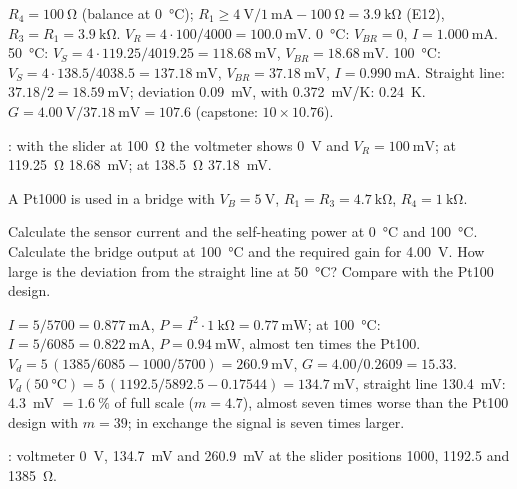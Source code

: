 \begin{solution}
\begin{talist}
\ta $R_4 = \SI{100}{\ohm}$ (balance at \SI{0}{\celsius}); $R_1 \geq \SI{4}{\volt}/\SI{1}{\milli\ampere} - \SI{100}{\ohm} = \SI{3.9}{\kilo\ohm}$ (E12), $R_3 = R_1 = \SI{3.9}{\kilo\ohm}$.
\ta $V_R = 4\cdot 100/4000 = \SI{100.0}{\milli\volt}$.
	\SI{0}{\celsius}: $V_{BR} = 0$, $I = \SI{1.000}{\milli\ampere}$.
	\SI{50}{\celsius}: $V_S = 4\cdot 119.25/4019.25 = \SI{118.68}{\milli\volt}$, $V_{BR} = \SI{18.68}{\milli\volt}$.
	\SI{100}{\celsius}: $V_S = 4\cdot 138.5/4038.5 = \SI{137.18}{\milli\volt}$, $V_{BR} = \SI{37.18}{\milli\volt}$, $I = \SI{0.990}{\milli\ampere}$.
\ta Straight line: $37.18/2 = \SI{18.59}{\milli\volt}$; deviation \SI{0.09}{\milli\volt}, with \SI{0.372}{\milli\volt/\kelvin}: \SI{0.24}{\kelvin}.
\ta $G = \SI{4.00}{\volt}/\SI{37.18}{\milli\volt} = 107.6$ (capstone: $10\times 10.76$).
\item[] : with the slider at \SI{100}{\ohm} the voltmeter shows \SI{0}{\volt} and $V_R = \SI{100}{\milli\volt}$;
	at \SI{119.25}{\ohm} \SI{18.68}{\milli\volt}; at \SI{138.5}{\ohm} \SI{37.18}{\milli\volt}.
\end{talist}
\end{solution}

A Pt1000 is used in a bridge with $V_B = \SI{5}{\volt}$, $R_1 = R_3 = \SI{4.7}{\kilo\ohm}$, $R_4 = \SI{1}{\kilo\ohm}$.
\begin{talist}
\ta Calculate the sensor current and the self-heating power at \SI{0}{\celsius} and \SI{100}{\celsius}.
\ta Calculate the bridge output at \SI{100}{\celsius} and the required gain for \SI{4.00}{\volt}.
\ta How large is the deviation from the straight line at \SI{50}{\celsius}? Compare with the Pt100 design.
\end{talist}

\begin{solution}
\begin{talist}
\ta $I = 5/5700 = \SI{0.877}{\milli\ampere}$, $P = I^2\cdot\SI{1}{\kilo\ohm} = \SI{0.77}{\milli\watt}$;
	at \SI{100}{\celsius}: $I = 5/6085 = \SI{0.822}{\milli\ampere}$, $P = \SI{0.94}{\milli\watt}$, almost ten times the Pt100.
\ta $V_d = 5\,(1385/6085 - 1000/5700) = \SI{260.9}{\milli\volt}$, $G = 4.00/0.2609 = 15.33$.
\ta $V_d(\SI{50}{\celsius}) = 5\,(1192.5/5892.5 - 0.17544) = \SI{134.7}{\milli\volt}$, straight line \SI{130.4}{\milli\volt}:
	\SI{4.3}{\milli\volt} $= \SI{1.6}{\percent}$ of full scale ($m = 4.7$), almost seven times worse than the Pt100 design with $m = 39$; in exchange the signal is seven times larger.
\item[] : voltmeter \SI{0}{\volt}, \SI{134.7}{\milli\volt} and \SI{260.9}{\milli\volt} at the slider positions 1000, 1192.5 and \SI{1385}{\ohm}.
\end{talist}
\end{solution}

